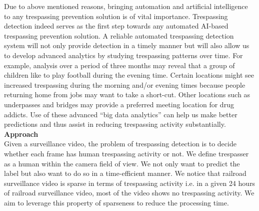 Due to above mentioned reasons, bringing automation and artificial intelligence to any trespassing prevention solution is of vital importance. Trespassing detection indeed serves as the first step towards any automated AI-based trespassing prevention solution. A reliable automated trespassing detection system will not only provide detection in a timely manner but will also allow us to develop advanced analytics by studying trespassing patterns over time. For example, analysis over a period of three months may reveal that a group of children like to play football during the evening time. Certain locations might see increased trespassing during the morning and/or evening times because people returning home from jobs may want to take a short-cut. Other locations such as underpasses and bridges may provide a preferred meeting location for drug addicts. Use of these advanced ``big data analytics'' can help us make better predictions and thus assist in  reducing trespassing activity substantially.
\\ \textbf{Approach}\\ 
Given a surveillance video, the problem of trespassing detection is to decide whether each frame has human trespassing activity or not. We define trespasser as a human within the camera field of view. We not only want to predict the label but also want to do so in a time-efficient manner. We notice that railroad surveillance video is sparse in terms of trespassing activity i.e. in a given 24 hours of railroad surveillance video, most of the video shows no trespassing activity. We aim to leverage this property of sparseness to reduce the processing time. 

